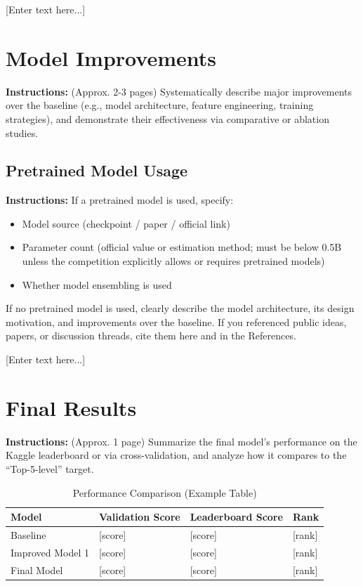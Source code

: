 \documentclass[journal]{IEEEtran}
\begin{document}
[Enter text here...]

\section{Model Improvements}
\label{sec:improvements}
\textbf{Instructions:} (Approx. 2-3 pages)
Systematically describe major improvements over the baseline (e.g., model architecture, feature engineering, training strategies), and demonstrate their effectiveness via comparative or ablation studies.

\subsection{Pretrained Model Usage}
\textbf{Instructions:} If a pretrained model is used, specify:
\begin{itemize}
    \item Model source (checkpoint / paper / official link)
    \item Parameter count (official value or estimation method; must be below 0.5B unless the competition explicitly allows or requires pretrained models)
    \item Whether model ensembling is used
\end{itemize}
If no pretrained model is used, clearly describe the model architecture, its design motivation, and improvements over the baseline. If you referenced public ideas, papers, or discussion threads, cite them here and in the References.

[Enter text here...]

\section{Final Results}
\label{sec:results}
\textbf{Instructions:} (Approx. 1 page)
Summarize the final model's performance on the Kaggle leaderboard or via cross-validation, and analyze how it compares to the ``Top-5-level'' target.

\begin{table}[h]
\caption{Performance Comparison (Example Table)}
\label{tab:results}
\centering
\renewcommand{\arraystretch}{1.3}
\begin{tabularx}{0.9\textwidth}{lXXX}
\toprule
\textbf{Model} & \textbf{Validation Score} & \textbf{Leaderboard Score} & \textbf{Rank} \\
\midrule
Baseline & [score] & [score] & [rank] \\
Improved Model 1 & [score] & [score] & [rank] \\
Final Model & [score] & [score] & [rank] \\
\bottomrule
\end{tabularx}
\end{table}
\end{document}
